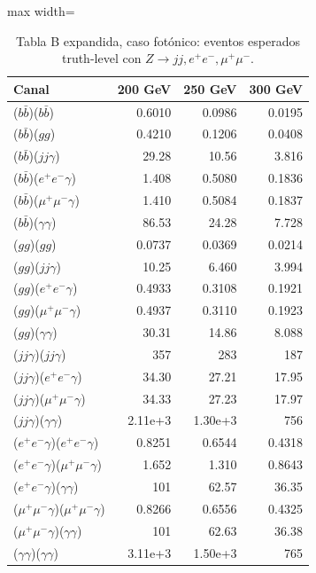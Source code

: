 \documentclass[10pt]{article}
\begin{document}
\begin{table}[H]
\centering
\scriptsize
\caption{Tabla B expandida, caso fotónico: eventos esperados truth-level con $Z\to jj,e^+e^-,\mu^+\mu^-$.}
\label{tab:B_fotonico}
\begin{adjustbox}{max width=\textwidth}
\begin{tabular}{lrrr}
\toprule
Canal & 200 GeV & 250 GeV & 300 GeV \\
\midrule
($b\bar b$)($b\bar b$) & 0.6010 & 0.0986 & 0.0195 \\
($b\bar b$)($gg$) & 0.4210 & 0.1206 & 0.0408 \\
($b\bar b$)($jj\gamma$) & 29.28 & 10.56 & 3.816 \\
($b\bar b$)($e^+e^-\gamma$) & 1.408 & 0.5080 & 0.1836 \\
($b\bar b$)($\mu^+\mu^-\gamma$) & 1.410 & 0.5084 & 0.1837 \\
($b\bar b$)($\gamma\gamma$) & 86.53 & 24.28 & 7.728 \\
($gg$)($gg$) & 0.0737 & 0.0369 & 0.0214 \\
($gg$)($jj\gamma$) & 10.25 & 6.460 & 3.994 \\
($gg$)($e^+e^-\gamma$) & 0.4933 & 0.3108 & 0.1921 \\
($gg$)($\mu^+\mu^-\gamma$) & 0.4937 & 0.3110 & 0.1923 \\
($gg$)($\gamma\gamma$) & 30.31 & 14.86 & 8.088 \\
($jj\gamma$)($jj\gamma$) & 357 & 283 & 187 \\
($jj\gamma$)($e^+e^-\gamma$) & 34.30 & 27.21 & 17.95 \\
($jj\gamma$)($\mu^+\mu^-\gamma$) & 34.33 & 27.23 & 17.97 \\
($jj\gamma$)($\gamma\gamma$) & 2.11e+3 & 1.30e+3 & 756 \\
($e^+e^-\gamma$)($e^+e^-\gamma$) & 0.8251 & 0.6544 & 0.4318 \\
($e^+e^-\gamma$)($\mu^+\mu^-\gamma$) & 1.652 & 1.310 & 0.8643 \\
($e^+e^-\gamma$)($\gamma\gamma$) & 101 & 62.57 & 36.35 \\
($\mu^+\mu^-\gamma$)($\mu^+\mu^-\gamma$) & 0.8266 & 0.6556 & 0.4325 \\
($\mu^+\mu^-\gamma$)($\gamma\gamma$) & 101 & 62.63 & 36.38 \\
($\gamma\gamma$)($\gamma\gamma$) & 3.11e+3 & 1.50e+3 & 765 \\
\bottomrule
\end{tabular}
\end{adjustbox}
\end{table}
\end{document}
